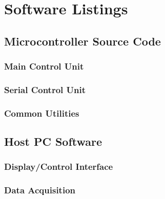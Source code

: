 \chapter{Software Listings}
\lstset{numbers=left, tabsize=2, breakatwhitespace=true}
\lstset{columns=fullflexible}
\lstset{breaklines=true}
\section[Controller Source]{Microcontroller Source Code}

\subsection{Main Control Unit}
\lstset{language=c}



\subsection{Serial Control Unit}


\subsection{Common Utilities}




\section{Host PC Software}
\lstset{language=python}
\subsection{Display/Control Interface}


\subsection{Data Acquisition}


